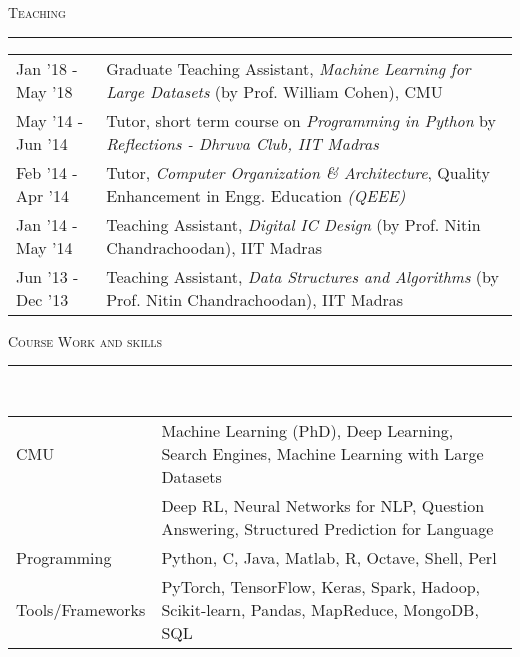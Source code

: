 \documentclass[8pt,a4paper,English]{article}
\newcommand{\lv}{\color{table-border}\vrule}
\newcommand\roottitle[1]{ \vspace{3mm} \noindent \textsc{ \normalsize #1} \vspace{1.5mm} \nopagebreak[4] \color{gray} \hrule \color{black} \vspace{2mm} \noindent \small }
\begin{document}
{\roottitle{Teaching}
\renewcommand{\arraystretch}{1.2}
\setlength\tabcolsep{8pt}
\begin{tabularx}{\textwidth}{ R{2.6cm} !{\lv} X }
  Jan '18 - May '18 & Graduate Teaching Assistant, \textit{Machine Learning for Large Datasets} (by Prof. William Cohen), CMU\\
  May '14 - Jun '14 & Tutor, short term course on \textit{ Programming in Python} by \textit{Reflections - Dhruva Club, IIT Madras}\\
  Feb '14 - Apr '14 & Tutor, \textit{Computer Organization \& Architecture}, Quality Enhancement in Engg. Education \textit{(QEEE)} \\
  Jan '14 - May '14 & Teaching Assistant, \textit{Digital IC Design} (by Prof. Nitin Chandrachoodan), IIT Madras \\
  Jun '13 - Dec '13 & Teaching Assistant, \textit{Data Structures and Algorithms} (by Prof. Nitin Chandrachoodan), IIT Madras \\
\end{tabularx}


\roottitle{Course Work and skills} \\
\renewcommand{\arraystretch}{1.2}
\setlength\tabcolsep{8pt}
\begin{tabularx}{\textwidth}{ R{2.8cm} !{\lv} X }
	CMU                        & Machine Learning (PhD), Deep Learning, Search Engines, Machine Learning with Large Datasets \\
		& Deep RL, Neural Networks for NLP, Question Answering, Structured Prediction for Language \\
	Programming                & Python, C, Java, Matlab, R, Octave, Shell, Perl \\
	Tools/Frameworks           & PyTorch, TensorFlow, Keras, Spark, Hadoop, Scikit-learn, Pandas, MapReduce, MongoDB, SQL \\
\end{tabularx}

}
\end{document}
